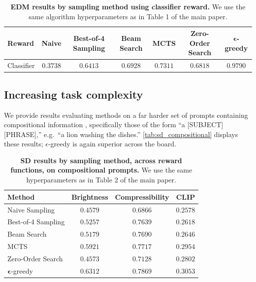 \documentclass{article}
\begin{document}
\begin{table}[h]
  \centering
  \caption{\small \textbf{EDM results by sampling method using classifier reward.} We use the same algorithm hyperparameters as in Table 1 of the main paper.}
  \label{tab:edm_classifier}
  \begin{tabular}{lcccccc}
    \toprule
    \textbf{Reward} & \textbf{Naive} & \textbf{Best-of-4 Sampling} & \textbf{Beam Search} & \textbf{MCTS} & \textbf{Zero-Order Search} & $\bm{\epsilon}$\textbf{-greedy} \\
    \midrule
    Classifier & $0.3738$ & $0.6413$ & $0.6928$ & $0.7311$ & $0.6818$ & $\mathbf{0.9790}$ \\
    \bottomrule
  \end{tabular}
\end{table}

\subsection{Increasing task complexity}

We provide results evaluating methods on a far harder set of prompts containing compositional information \cite{black2024trainingdiffusionmodelsreinforcement}, specifically those of the form ``a [SUBJECT] [PHRASE],'' e.g.\ ``a lion washing the dishes.'' \autoref{tab:sd_compositional} displays these results;
$\epsilon$-greedy is again superior across the board.

\begin{table}[h]
  \centering
  \caption{\small \textbf{SD results by sampling method, across reward functions, on compositional prompts.} We use the same hyperparameters as in Table 2 of the main paper.}
  \label{tab:sd_compositional}
  \begin{tabular}{lccc}
    \toprule
    \textbf{Method} & \textbf{Brightness} & \textbf{Compressibility} & \textbf{CLIP} \\
    \midrule
    Naive Sampling & $0.4579$ & $0.6866$ & $0.2578$ \\
    Best-of-4 Sampling & $0.5257$ & $0.7639$ & $0.2618$ \\
    Beam Search & $0.5179$ & $0.7690$ & $0.2646$ \\
    MCTS & $0.5921$ & $0.7717$ & $0.2954$ \\
    Zero-Order Search & $0.4573$ & $0.7128$ & $0.2802$ \\
    $\bm{\epsilon}$-greedy & $\mathbf{0.6312}$ & $\mathbf{0.7869}$ & $\mathbf{0.3053}$ \\
    \bottomrule
  \end{tabular}
\end{table}
\end{document}
